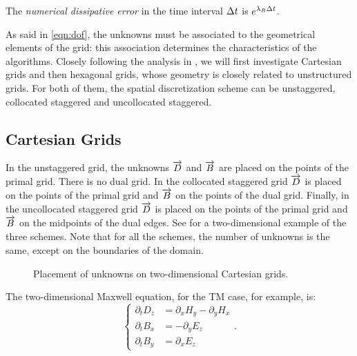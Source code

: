 The \emph{numerical dissipative error} in the time interval
$\Delta t$ is $e^{\lambda_R \Delta t}$.

As said in \eqref{eqn:dof}, the unknowns must be associated to the
geometrical elements of the grid: this association determines the
characteristics of the algorithms. Closely following the analysis in
\cite{liu_fourier}, we will first investigate
Cartesian
grids and then hexagonal grids, whose geometry is closely related to
unstructured grids. For both of them, the spatial discretization
scheme can be unstaggered, collocated staggered and uncollocated
staggered.

\subsection{Cartesian Grids} 

In the unstaggered grid, the unknowns $\overrightarrow{D}$ and $\overrightarrow{B}$ are placed on
the points of the primal grid. There is no dual grid. In the
collocated staggered grid $\overrightarrow{D}$ is placed on the points of the primal
grid and $\overrightarrow{B}$ on the points of the dual grid. Finally, in the
uncollocated staggered grid $\overrightarrow{D}$ is placed on the points of the primal
grid and $\overrightarrow{B}$ on the midpoints of the dual edges. See
 for a two-dimensional example of the three
schemes.  Note that for all the schemes, the number of unknowns is the
same, except on the boundaries of the domain.

\begin{figure}[htbp]
  \begin{center}
    \subfigure[Unstaggered.]{\resizebox{3.5cm}{!}{}}
  \end{center}
  \caption{Placement of unknowns on two-dimensional Cartesian grids.}
  \label{fig:liu_fig1}
\end{figure}

The two-dimensional Maxwell equation, for the TM case, for example, is:
\begin{equation} \label{eqn:fourier_maxwell_2d} \begin{cases}
  \partial_t D_z & = \partial_x H_y - \partial_y H_x \\
  \partial_t B_x & = - \partial_y E_z \\
  \partial_t B_y & = \partial_x E_z
\end{cases} . \end{equation}

